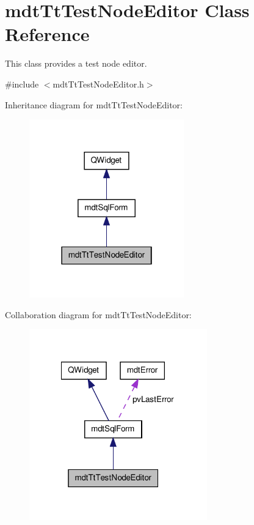 \hypertarget{classmdt_tt_test_node_editor}{\section{mdt\-Tt\-Test\-Node\-Editor Class Reference}
\label{classmdt_tt_test_node_editor}
}


This class provides a test node editor.  




{\ttfamily \#include $<$mdt\-Tt\-Test\-Node\-Editor.\-h$>$}



Inheritance diagram for mdt\-Tt\-Test\-Node\-Editor\-:\nopagebreak
\begin{figure}[H]
\begin{center}
\leavevmode
\includegraphics[width=190pt]{classmdt_tt_test_node_editor__inherit__graph}
\end{center}
\end{figure}


Collaboration diagram for mdt\-Tt\-Test\-Node\-Editor\-:\nopagebreak
\begin{figure}[H]
\begin{center}
\leavevmode
\includegraphics[width=218pt]{classmdt_tt_test_node_editor__coll__graph}
\end{center}
\end{figure}
